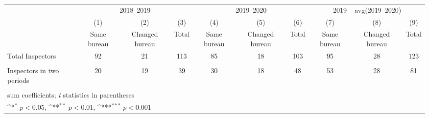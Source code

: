 {
\def\sym#1{\ifmmode^{#1}\else\(^{#1}\)\fi}
\begin{tabular}{l*{9}{c}}
\toprule
            &\multicolumn{3}{c}{2018–2019}                                    &\multicolumn{3}{c}{2019–2020}                                    &\multicolumn{3}{c}{2019 – avg(2019–2020)}                        \\\cmidrule(lr){2-4}\cmidrule(lr){5-7}\cmidrule(lr){8-10}
            &\multicolumn{1}{c}{(1)}&\multicolumn{1}{c}{(2)}&\multicolumn{1}{c}{(3)}&\multicolumn{1}{c}{(4)}&\multicolumn{1}{c}{(5)}&\multicolumn{1}{c}{(6)}&\multicolumn{1}{c}{(7)}&\multicolumn{1}{c}{(8)}&\multicolumn{1}{c}{(9)}\\
            &\multicolumn{1}{c}{Same bureau}&\multicolumn{1}{c}{Changed bureau}&\multicolumn{1}{c}{Total}&\multicolumn{1}{c}{Same bureau}&\multicolumn{1}{c}{Changed bureau}&\multicolumn{1}{c}{Total}&\multicolumn{1}{c}{Same bureau}&\multicolumn{1}{c}{Changed bureau}&\multicolumn{1}{c}{Total}\\
\midrule
Total Inspectors&          92         &          21         &         113         &          85         &          18         &         103         &          95         &          28         &         123         \\
            &                     &                     &                     &                     &                     &                     &                     &                     &                     \\
Inspectors in two periods&          20         &          19         &          39         &          30         &          18         &          48         &          53         &          28         &          81         \\
            &                     &                     &                     &                     &                     &                     &                     &                     &                     \\
\bottomrule
\multicolumn{10}{l}{\footnotesize sum coefficients; \textit{t} statistics in parentheses}\\
\multicolumn{10}{l}{\footnotesize \sym{*} \(p<0.05\), \sym{**} \(p<0.01\), \sym{***} \(p<0.001\)}\\
\end{tabular}
}
